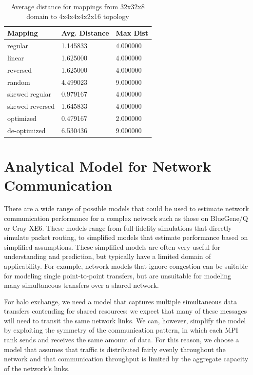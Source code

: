 \documentclass{acm_proc_article-sp}
\begin{document}
\begin{table}
  \caption{Average distance for mappings from 32x32x8 domain to 4x4x4x4x2x16 topology}
  {\footnotesize
    \begin{tabular}{| l | l | p{1.5cm} |}
    \hline
    Mapping         & Avg. Distance & Max Dist\\ \hline
    regular         & 1.145833 & 4.000000\\ \hline
    linear          & 1.625000 & 4.000000\\ \hline
    reversed        & 1.625000 & 4.000000\\ \hline
    random          & 4.499023 & 9.000000\\ \hline
    skewed regular  & 0.979167 & 4.000000\\ \hline
    skewed reversed & 1.645833 & 4.000000\\ \hline
    optimized       & 0.479167 & 2.000000\\ \hline
    de-optimized    & 6.530436 & 9.000000\\ \hline
    \hline
    \end{tabular}
  }
\end{table}


\section{Analytical Model for Network Communication}\label{sect:model}

There are a wide range of possible models that could be used to
estimate network communication performance for a complex network
such as those on BlueGene/Q or Cray XE6.  These models range from
full-fidelity simulations that directly simulate packet routing, to
simplified models that estimate performance based on simplified
assumptions.  These simplified models are often very useful for
understanding and prediction, but typically have a limited domain
of applicability.  For example, network models that ignore congestion
can be suitable for modeling single point-to-point transfers, but are
unsuitable for modeling many simultaneous transfers over a shared network.

For halo exchange, we need a model that captures multiple
simultaneous data transfers contending for shared resources: we
expect that many of these messages will need to transit the
same network links.  We can, however, simplify the model by exploiting the
symmetry of the communication pattern, in which each MPI rank sends
and receives the same amount of data. For this reason, we choose a
model that assumes that traffic is distributed fairly evenly
throughout the network and that communication throughput is limited
by the aggregate capacity of the network's links.
\end{document}
